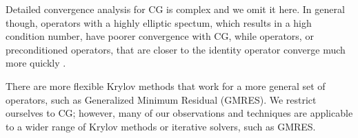 Detailed convergence analysis for CG is complex and we omit it here.
In general though, operators with a highly elliptic spectum, which results in a high condition number, have poorer convergence with CG, while operators, or preconditioned operators, that are closer to the identity operator converge much more quickly \cite{golub1989matrix}.

There are more flexible Krylov methods that work for a more general set of operators, such as Generalized Minimum Residual (GMRES).
We restrict ourselves to CG; however, many of our observations and techniques are applicable to a wider range of Krylov methods or iterative solvers, such as GMRES.
